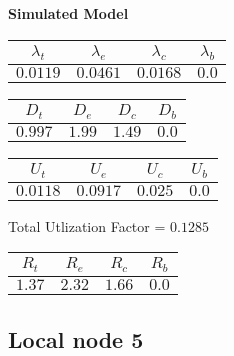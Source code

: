 \documentclass{article}
\begin{document}
\begin{minipage}{0.5\textwidth}
\centering	\textbf{Simulated Model}
\begin{table}[H]
\centering
\begin{tabular}{@{}cccc@{}}
\toprule
$\lambda_t$ & $\lambda_e$ & $\lambda_c$ & $\lambda_b$\\
\midrule
$0.0119$ & $0.0461$ & $0.0168$ & $0.0$\\
\bottomrule
\end{tabular}
\end{table}
\begin{table}[H]
\centering
\begin{tabular}{@{}cccc@{}}
\toprule
$D_t$ & $D_e$ & $D_c$ & $D_b$\\
\midrule
$0.997$ & $1.99$ & $1.49$ & $0.0$\\
\bottomrule
\end{tabular}
\end{table}\begin{table}[H]
\centering
\begin{tabular}{@{}cccc@{}}
\toprule
$U_t$ & $U_e$ & $U_c$ & $U_b$\\
\midrule
$0.0118$ & $0.0917$ & $0.025$ & $0.0$\\
\bottomrule
\end{tabular}
\end{table}
\centering Total Utlization Factor = $0.1285$
\begin{table}[H]
\centering
\begin{tabular}{@{}cccc@{}}
\toprule
$R_t$ & $R_e$ & $R_c$ & $R_b$\\
\midrule
$1.37$ & $2.32$ & $1.66$ & $0.0$\\
\bottomrule
\end{tabular}
\end{table}
\end{minipage}\subsection{Local node 5}
\end{document}
